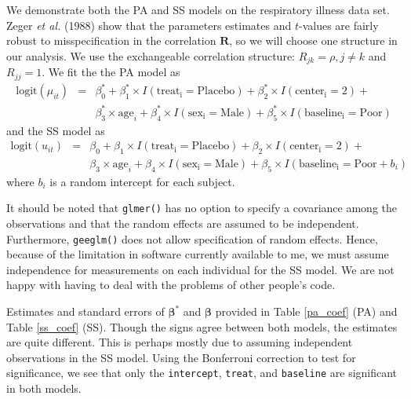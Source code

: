 \documentclass[12pt]{article}
\newcommand{\m}[1]{\mathbf{\bm{#1}}}
\begin{document}
\noindent We demonstrate both the PA and SS models on the respiratory illness data set. Zeger \emph{et al.} (1988) show that the parameters estimates and $t$-values are fairly robust to misspecification in the correlation $\m{R}$, so we will choose one structure in our analysis. We use the exchangeable correlation structure: $R_{jk} = \rho, j\neq k$ and $R_{jj} = 1$. We fit the the PA model as
\begin{eqnarray*}
\mathrm{logit}(\mu_{it}) &=& \beta_0^* + \beta_1^*\times I(\mathrm{treat_i=Placebo}) + \beta_2^*\times I(\mathrm{center_i=2}) +  \\
 && \beta_3^*\times\mathrm{age}_i + \beta_4^*\times I(\mathrm{sex_i=Male}) + \beta_5^*\times I(\mathrm{baseline_i=Poor})
\end{eqnarray*}
and the SS model as
\begin{eqnarray*}
\mathrm{logit}(u_{it}) &=& \beta_0 + \beta_1\times I(\mathrm{treat_i=Placebo}) + \beta_2\times I(\mathrm{center_i=2}) +  \\
 && \beta_3\times\mathrm{age}_i + \beta_4\times I(\mathrm{sex_i=Male}) + \beta_5\times I(\mathrm{baseline_i=Poor} + b_i)
\end{eqnarray*}
where $b_i$ is a random intercept for each subject.
\bigskip

\noindent It should be noted that \texttt{glmer()} has no option to specify a covariance among the observations and that the random effects are assumed to be independent. Furthermore, \texttt{geeglm()} does not allow specification of random effects. Hence, because of the limitation in software currently available to me, we must assume independence for measurements on each individual for the SS model. We are not happy with having to deal with the problems of other people's code.
\bigskip

\noindent Estimates and standard errors of $\m{\beta}^*$ and $\m{\beta}$ provided in Table \ref{pa_coef} (PA) and Table \ref{ss_coef} (SS). Though the signs agree between both models, the estimates are quite different. This is perhaps mostly due to assuming independent observations in the SS model. Using the Bonferroni correction to test for significance, we see that only the \texttt{intercept}, \texttt{treat}, and \texttt{baseline} are significant in both models.
\bigskip
\end{document}

